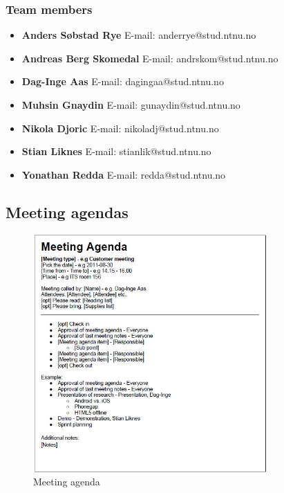 		\subsubsection{Team members}
				\begin{itemize}
					\item {\bf Anders Søbstad Rye} \newline
							E-mail: anderrye@stud.ntnu.no
					\item {\bf Andreas Berg Skomedal} \newline
							E-mail: andrskom@stud.ntnu.no
					\item {\bf Dag-Inge Aas} \newline
							E-mail: dagingaa@stud.ntnu.no
					\item {\bf Muhsin Gnaydin} \newline
							E-mail: gunaydin@stud.ntnu.no
					\item {\bf Nikola Djoric} \newline
							E-mail: nikoladj@stud.ntnu.no
					\item {\bf Stian Liknes} \newline
							E-mail: stianlik@stud.ntnu.no
					\item {\bf Yonathan Redda} \newline
							E-mail: redda@stud.ntnu.no
				\end{itemize}
	\newpage
	\subsection{Meeting agendas}
		\begin{figure}[htb]
			\centering
			\includegraphics[width=0.8\textwidth]{appendix/meeting_agenda.jpg}
			\caption{Meeting agenda}
			\label{fig:meeting-agenda}
		\end{figure}
	
